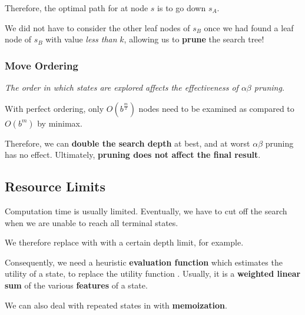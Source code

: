             Therefore, the optimal path for  at node $s$ is to go down $s_A$.

            We did not have to consider the other leaf nodes of $s_B$ once we had found a leaf node of $s_B$ with value \emph{less than} $k$, allowing us to \textbf{prune} the search tree!

        \subsubsection{Move Ordering}
            \emph{The order in which states are explored affects the effectiveness of $\alpha$\textendash$\beta$ pruning.}

            With perfect ordering, only $O(b^{\frac{m}{2}})$ nodes need to be examined as compared to $O(b^m)$ by minimax.

            Therefore, we can \textbf{double the search depth} at best, and at worst $\alpha$\textendash$\beta$ pruning has no effect. Ultimately, \textbf{pruning does not affect the final result}.

    \subsection{Resource Limits}
        Computation time is usually limited. Eventually, we have to cut off the search when we are unable to reach all terminal states.

        We therefore replace  with  with a certain depth limit, for example.

        Consequently, we need a heuristic \textbf{evaluation function}  which estimates the utility of a state, to replace the utility function . Usually, it is a \textbf{weighted linear sum} of the various \textbf{features} of a state.

        We can also deal with repeated states in  with \textbf{memoization}.
